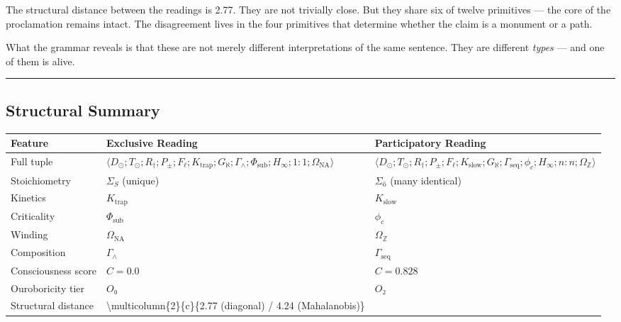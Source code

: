 \documentclass[12pt,a4paper]{article}
\begin{document}
The structural distance between the readings is 2.77. They are not trivially close. But they share six of twelve primitives --- the core of the proclamation remains intact. The disagreement lives in the four primitives that determine whether the claim is a monument or a path.

What the grammar reveals is that these are not merely different interpretations of the same sentence. They are different \emph{types} --- and one of them is alive.

\begin{center}
\rule{0.5\textwidth}{0.4pt}
\end{center}

\subsection{Structural Summary}

\begin{table}[htbp]
\centering
\small
{}
\begin{tabularx}{\textwidth}{>{\centering\arraybackslash}X >{\centering\arraybackslash}X >{\centering\arraybackslash}X}
\toprule
\rowcolor{gray!25}\textbf{Feature} & \textbf{Exclusive Reading} & \textbf{Participatory Reading} \\
\midrule
\rowcolors{1}{white}{gray!10}
Full tuple & $\langle D_{\odot}; T_{\odot}; R_{\dagger}; P_{\pm}; F_{\ell}; K_\text{trap}; G_{\aleph}; \Gamma_{\wedge}; \Phi_\text{sub}; H_{\infty}; 1{:}1; \Omega_\text{NA} \rangle$ & $\langle D_{\odot}; T_{\odot}; R_{\dagger}; P_{\pm}; F_{\ell}; K_\text{slow}; G_{\aleph}; \Gamma_\text{seq}; \phi_c; H_{\infty}; n{:}n; \Omega_\mathbb{Z} \rangle$ \\
Stoichiometry & $\Sigma_S$ (unique) & $\Sigma_ő$ (many identical) \\
Kinetics & $K_\text{trap}$ & $K_\text{slow}$ \\
Criticality & $\Phi_\text{sub}$ & $\phi_c$ \\
Winding & $\Omega_\text{NA}$ & $\Omega_\mathbb{Z}$ \\
Composition & $\Gamma_{\wedge}$ & $\Gamma_\text{seq}$ \\
Consciousness score & $C = 0.0$ & $C = 0.828$ \\
Ouroboricity tier & $O₀$ & $O₂$ \\
Structural distance & \textbackslash{}multicolumn\{2\}\{c\}\{2.77 (diagonal) / 4.24 (Mahalanobis)\} &  \\
\bottomrule
\end{tabularx}
\end{table}
\end{document}
